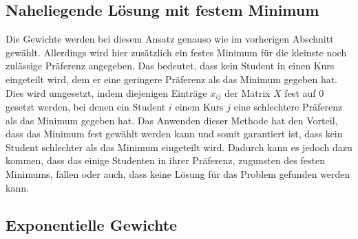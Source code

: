         \subsection{Naheliegende Lösung mit festem Minimum}
            Die Gewichte werden bei diesem Ansatz genauso wie im vorherigen Abschnitt gewählt.
            Allerdings wird hier zusätzlich ein festes Minimum für die kleinste noch zulässige Präferenz angegeben.
            Das bedeutet, dass kein Student in einen Kurs eingeteilt wird, dem er eine geringere Präferenz als das Minimum gegeben hat.
            Dies wird umgesetzt, indem diejenigen Einträge $ x_{ij} $ der Matrix $ X $ fest auf $ 0 $ gesetzt werden, bei denen ein Student $ i $ einem Kurs $ j $ eine schlechtere Präferenz als das Minimum gegeben hat.
            Das Anwenden dieser Methode hat den Vorteil, dass das Minimum fest gewählt werden kann und somit garantiert ist, dass kein Student schlechter als das Minimum eingeteilt wird.
            Dadurch kann es jedoch dazu kommen, dass das einige Studenten in ihrer Präferenz, zugunsten des festen Minimums, fallen oder auch, dass keine Lösung für das Problem gefunden werden kann.
        
        \subsection{Exponentielle Gewichte}
            
        